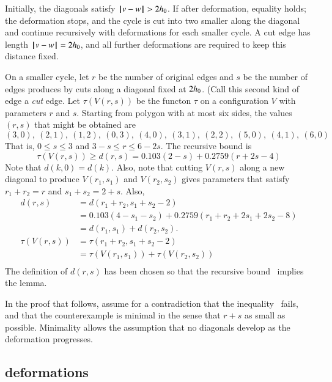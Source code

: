 Initially, the diagonals satisfy ${\hskip0.1em|\hskip-0.15em|\hskip0.1em}v - w{\hskip0.1em|\hskip-0.15em|\hskip0.1em}>2{h_0}$.
If after deformation, equality holds;  the deformation stops, and the cycle is cut into two smaller along the diagonal
and continue recursively with deformations for each smaller cycle.  A cut edge has length ${\hskip0.1em|\hskip-0.15em|\hskip0.1em}v - w{\hskip0.1em|\hskip-0.15em|\hskip0.1em}=2{h_0}$, and
 all further deformations are required to keep this distance fixed.  

On a smaller cycle, let $r$ be the number of original edges and $s$ be the number of edges produces by cuts along a diagonal fixed at $2{h_0}$.  (Call this second kind of edge a {\it cut} edge.  Let $\tau(V(r,s))$ be the functon $\tau$ on a configuration $V$ with parameters $r$ and $s$.  Starting from polygon with at most six sides, the values $(r,s)$ that might be obtained are
%
%
%
$$
(3,0),~(2,1),~(1,2),~(0,3),~
(4,0),~(3,1),~(2,2),~
(5,0),~(4,1),~
(6,0)
$$
That is, $0\le s\le 3$ and $3-s\le r\le 6-2s$.
The recursive bound is
\begin{equation}\label{eqn:drs}
\tau(V(r,s)) \ge d(r,s) = 0.103 (2-s) + 0.2759 (r+2s-4) 
\end{equation}
Note that $d(k,0) = d(k)$. Also, note that cutting
$V(r,s)$ along a new diagonal to produce $V(r_1,s_1)$
and $V(r_2,s_2)$ gives parameters that satisfy $r_1+r_2=r$ and $s_1+s_2 = 2+s$.
Also,
\begin{equation}\label{eqn:drs-add}
\begin{array}{lll}
d(r,s) &= d(r_1+r_2,s_1+s_2-2) \\
  &=0.103 (4-s_1-s_2) + 0.2759 (r_1+r_2+2s_1+2s_2-8) \\
  &=d(r_1,s_1) + d(r_2,s_2).\\
\tau(V(r,s)) &= \tau(r_1+r_2,s_1+s_2-2)\\
  &=\tau(V(r_1,s_1)) +\tau(V(r_2,s_2))\\
\end{array}
\end{equation}
The definition of $d(r,s)$ has been
chosen so that the recursive 
bound~ implies the
lemma.
%

In the proof that follows,  assume for a contradiction that the
inequality~ fails, and that the counterexample is minimal in the sense that $r+s$ as small as possible.   Minimality allows the assumption that no diagonals develop as the deformation progresses.

\subsection{deformations}

